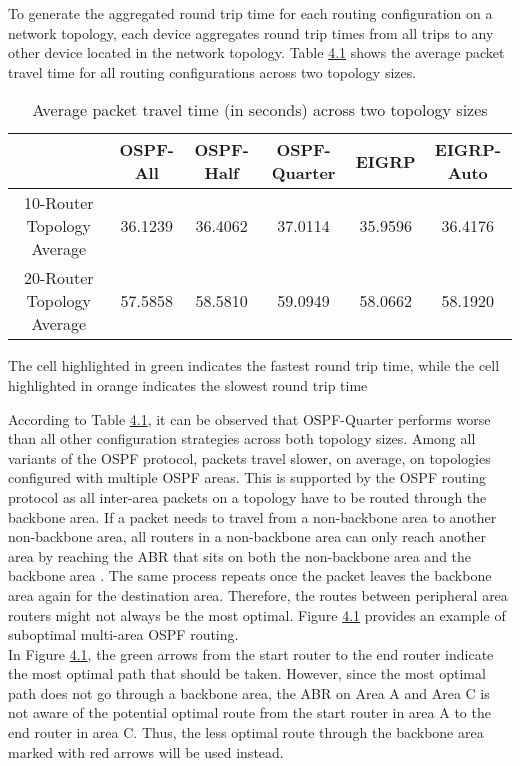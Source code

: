 \documentclass{uiucthesis2021}
\begin{document}
\noindent To generate the aggregated round trip time for each routing configuration on a network topology, each device aggregates round trip times from all trips to any other device located in the network topology. Table \hyperref[t41]{4.1} shows the average packet travel time for all routing configurations across two topology sizes.\\

\label{t41}
\begin{table}[!h]
\begin{center}
\begin{tabular}{|c||c|c|c|c|c|} 
 \hline
  & OSPF-All & OSPF-Half & OSPF-Quarter & EIGRP & EIGRP-Auto \\
 \hline\hline
10-Router Topology Average & 36.1239 & 36.4062 & \cellcolor{orange!25}37.0114 & \cellcolor{green!25}35.9596 & 36.4176 \\
\hline
20-Router Topology Average & \cellcolor{green!25}57.5858 & 58.5810 & \cellcolor{orange!25}59.0949 & 58.0662 & 58.1920 \\
\hline
\end{tabular}
\caption{Average packet travel time (in seconds) across two topology sizes}
The cell highlighted in green indicates the fastest round trip time,
while the cell highlighted in orange indicates the slowest round trip time
\end{center}
\end{table}

\noindent According to Table \hyperref[t41]{4.1}, it can be observed that OSPF-Quarter performs worse than all other configuration strategies across both topology sizes. Among all variants of the OSPF protocol, packets travel slower, on average, on topologies configured with multiple OSPF areas. This is supported by the OSPF routing protocol as all inter-area packets on a topology have to be routed through the backbone area. If a packet needs to travel from a non-backbone area to another non-backbone area, all routers in a non-backbone area can only reach another area by reaching the ABR that sits on both the non-backbone area and the backbone area \cite{zinin2003alternative}. The same process repeats once the packet leaves the backbone area again for the destination area. Therefore, the routes between peripheral area routers might not always be the most optimal. Figure \hyperref[f41]{4.1} provides an example of suboptimal multi-area OSPF routing.\\

\noindent In Figure \hyperref[f41]{4.1}, the green arrows from the start router to the end router indicate the most optimal path that should be taken. However, since the most optimal path does not go through a backbone area, the ABR on Area A and Area C is not aware of the potential optimal route from the start router in area A to the end router in area C. Thus, the less optimal route through the backbone area marked with red arrows will be used instead. \\
\end{document}
